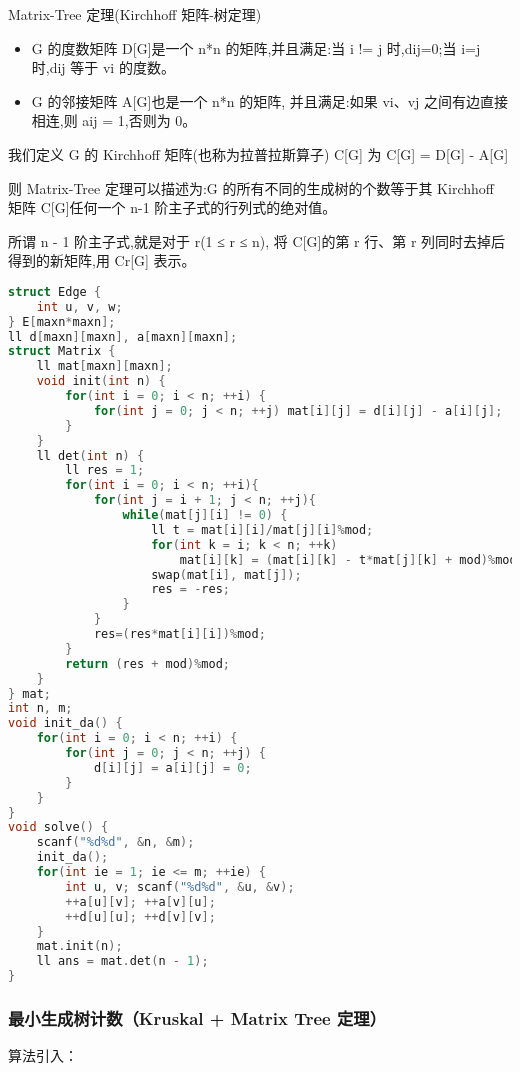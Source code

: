 Matrix-Tree 定理(Kirchhoff 矩阵-树定理)

\begin{itemize}
    \item G 的度数矩阵 D[G]是一个 n*n 的矩阵,并且满足:当 i != j 时,dij=0;当 i=j 时,dij 等于 vi 的度数。
    \item G 的邻接矩阵 A[G]也是一个 n*n 的矩阵, 并且满足:如果 vi、vj 之间有边直接相连,则 aij = 1,否则为 0。
\end{itemize}

我们定义 G 的 Kirchhoff 矩阵(也称为拉普拉斯算子) C[G] 为 C[G] = D[G] - A[G]

则 Matrix-Tree 定理可以描述为:G 的所有不同的生成树的个数等于其 Kirchhoff 矩阵 C[G]任何一个 n-1 阶主子式的行列式的绝对值。

所谓 n - 1 阶主子式,就是对于 r(1 ≤ r ≤ n), 将 C[G]的第 r 行、第 r 列同时去掉后得到的新矩阵,用 Cr[G] 表示。

\begin{lstlisting}[language=C++]
struct Edge {
    int u, v, w;
} E[maxn*maxn];
ll d[maxn][maxn], a[maxn][maxn];
struct Matrix {
    ll mat[maxn][maxn];
    void init(int n) {
        for(int i = 0; i < n; ++i) {
            for(int j = 0; j < n; ++j) mat[i][j] = d[i][j] - a[i][j];
        }
    }
    ll det(int n) {
        ll res = 1;
        for(int i = 0; i < n; ++i){
            for(int j = i + 1; j < n; ++j){
                while(mat[j][i] != 0) {
                    ll t = mat[i][i]/mat[j][i]%mod;
                    for(int k = i; k < n; ++k)
                        mat[i][k] = (mat[i][k] - t*mat[j][k] + mod)%mod;
                    swap(mat[i], mat[j]);
                    res = -res;
                }
            }
            res=(res*mat[i][i])%mod;
        }
        return (res + mod)%mod;
    }
} mat;
int n, m;
void init_da() {
    for(int i = 0; i < n; ++i) {
        for(int j = 0; j < n; ++j) {
            d[i][j] = a[i][j] = 0;
        }
    }
}
void solve() {
    scanf("%d%d", &n, &m);
    init_da();
    for(int ie = 1; ie <= m; ++ie) {
        int u, v; scanf("%d%d", &u, &v);
        ++a[u][v]; ++a[v][u];
        ++d[u][u]; ++d[v][v];
    }
    mat.init(n);
    ll ans = mat.det(n - 1);
}
\end{lstlisting}

\subsubsection{最小生成树计数（Kruskal + Matrix Tree 定理）}

算法引入：


